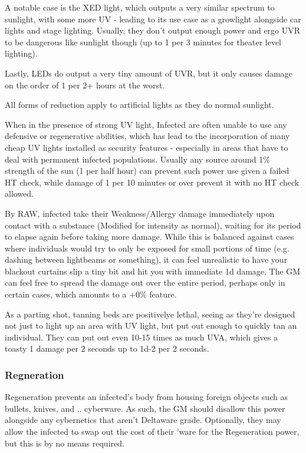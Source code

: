 \begin{multicols*}{3}
	A notable case is the XED light, which outputs a very similar spectrum to sunlight, with some more UV - leading to its use case as a growlight alongside car lights and stage lighting. Usually, they don't output enough power and ergo UVR to be dangerous like sunlight though (up to 1 per 3 minutes for theater level lighting).
	
	Lastly, LEDs do output a very tiny amount of UVR, but it only causes damage on the order of 1 per 2+ hours at the worst.
	
	All forms of reduction apply to artificial lights as they do normal sunlight.
	
	When in the presence of strong UV light, Infected are often unable to use any defensive or regenerative abilities, which has lead to the incorporation of many cheap UV lights installed as security features - especially in areas that have to deal with permanent infected populations. Usually any source around 1\% strength of the sun (1 per half hour) can prevent such power use given a failed HT check, while damage of 1 per 10 minutes or over prevent it with no HT check allowed.
	
	By RAW, infected take their Weakness/Allergy damage immediately upon contact with a substance (Modified for intensity as normal), waiting for its period to elapse again before taking more damage. While this is balanced against cases where individuals would try to only be exposed for small portions of time (e.g. dashing between lightbeams or something), it can feel unrealistic to have your blackout curtains slip a tiny bit and hit you with immediate 1d damage. The GM can feel free to spread the damage out over the entire period, perhaps only in certain cases, which amounts to a +0\% feature.
	
	As a parting shot, tanning beds are positivelye lethal, seeing as they're designed not just to light up an area with UV light, but put out enough to quickly tan an individual. They can put out even 10-15 times as much UVA, which gives a toasty 1 damage per 2 seconds up to 1d-2 per 2 seconds.
	
	\subsubsection{Regneration}
	
	Regeneration prevents an infected's body from housing foreign objects such as bullets, knives, and .. cyberware. As such, the GM should disallow this power alongside any cybernetics that aren't Deltaware grade. Optionally, they may allow the infected to swap out the cost of their 'ware for the Regeneration power, but this is by no means required.
	

\end{multicols*}
